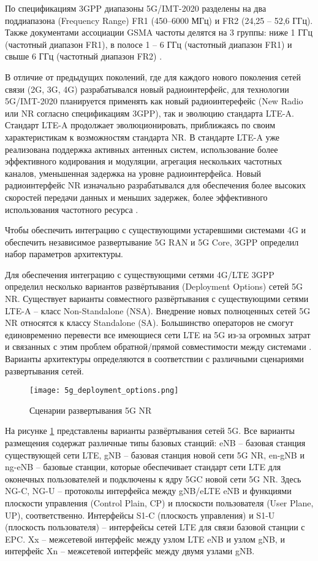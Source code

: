 По спецификациям 3GPP диапазоны 5G/IMT-2020 разделены на два поддиапазона (Frequency Range) FR1 (450–6000 МГц) и FR2 (24,25 – 52,6 ГГц). Также документами ассоциации GSMA частоты делятся на 3 группы: ниже 1 ГГц (частотный диапазон FR1), в полосе 1 – 6 ГГц (частотный диапазон FR1) и свыше 6 ГГц (частотный диапазон FR2) \cite{prikaz_minkomsvyazi_5G_IMT-2020}.

В отличие от предыдущих поколений, где для каждого нового поколения сетей связи (2G, 3G, 4G) разрабатывался новый радиоинтерфейс, для технологии 5G/IMT-2020 планируется применять как новый радиоинтерефейс (New Radio или NR согласно спецификациям 3GPP), так и эволюцию стандарта LTE-A. Стандарт LTE-A продолжает эволюционировать, приближаясь по своим характеристикам к возможностям стандарта NR. В стандарте LTE-A уже реализована поддержка активных антенных систем, использование более эффективного кодирования и модуляции, агрегация нескольких частотных каналов, уменьшенная задержка на уровне радиоинтерфейса. Новый радиоинтерфейс NR изначально разрабатывался для обеспечения более высоких скоростей передачи данных и меньших задержек, более эффективного использования частотного ресурса \cite{prikaz_minkomsvyazi_5G_IMT-2020}.

Чтобы обеспечить интеграцию с существующими устаревшими системами 4G и обеспечить независимое развертывание 5G RAN и 5G Core, 3GPP определил набор параметров архитектуры.

Для обеспечения интеграцию с существующими сетями 4G/LTE 3GPP определил несколько вариантов развёртывания (Deployment Options) сетей 5G NR.  Существует варианты совместного развёртывания с существующими сетями LTE-A -- класс Non-Standalone (NSA). Внедрение новых полноценных сетей 5G NR относятся к классу Standalone (SA). Большинство операторов не смогут единовременно перевести все имеющиеся сети LTE на 5G  из-за огромных затрат и связанных с этим проблем обратной/прямой совместимости между системами \cite{Teral2019,Kibria2018,Liu2020, ElRhayour2019}.  Варианты архитектуры определяются в соответствии с различными сценариями развертывания сетей. 

\begin{figure}[h!]
  \centering
   \texttt{[image: 5g\_deployment\_options.png]}
\caption{Сценарии развертывания 5G NR}
\label{fig:part1_5g_deployment_options}
\end{figure}

На рисунке \cref{fig:part1_5g_deployment_options} представлены варианты развёртывания сетей 5G. Все варианты размещения содержат различные типы базовых станций: eNB -- базовая станция существующей сети LTE, gNB -- базовая станция новой сети 5G NR,  en-gNB и ng-eNB -- базовые станции, которые обеспечивает стандарт сети LTE для оконечных пользователей и подключены к ядру 5GC новой сети 5G NR. Здесь NG-C, NG-U -- протоколы интерфейса между gNB/eLTE eNB и функциями  плоскости управления (Control Plain, CP) и плоскости пользователя (User Plane, UP), соответственно. Интерфейсы S1-C (плоскость управления) и S1-U (плоскость пользователя) -- интерфейсы сетей LTE для связи базовой станции с EPC. Xx -- межсетевой интерфейс между узлом LTE eNB и узлом gNB, и интерфейс Xn -- межсетевой интерфейс между двумя узлами gNB.

